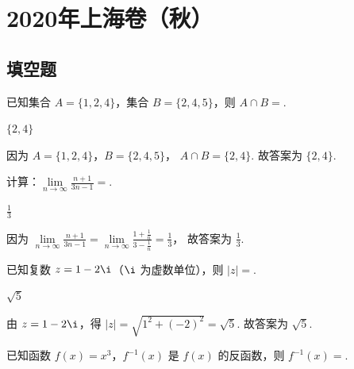 

\chapter{2020年上海卷（秋）}

\section{填空题}

\begin{problem}
已知集合 \(A=\{1,2,4\}\)，集合 \(B=\{2,4,5\}\)，则 \(A\cap B=\)\fillinblank{}.
\end{problem}

\begin{answer}
\(\{2,4\}\)
\end{answer}

\begin{solution}
因为 \(A=\{1,2,4\}\)，\(B=\{2,4,5\}\)，
\(A\cap B=\{2,4\}\).
故答案为 \(\{2,4\}\).
\end{solution}

\begin{problem}
计算：\(\lim\limits_{n\to\infty}\frac{n+1}{3n-1}=\)\fillinblank{}.
\end{problem}

\begin{answer}
\(\frac13\)
\end{answer}

\begin{solution}
因为
\(\lim\limits_{n\to\infty}\frac{n+1}{3n-1} =\lim\limits_{n\to\infty}\frac{1+\frac1n}{3-\frac1n} =\frac13\)，
故答案为 \(\frac13\).
\end{solution}

\begin{problem}
已知复数 \(z=1-2\i\)（\(\i\) 为虚数单位），则 \(|z|=\)\fillinblank{}.
\end{problem}

\begin{answer}
\(\sqrt5\)
\end{answer}

\begin{solution}
由 \(z=1-2\i\)，得
\(|z|=\sqrt{1^2+(-2)^2}=\sqrt5\).
故答案为 \(\sqrt5\).
\end{solution}

\begin{problem}
已知函数 \(f(x)=x^3\)，\(f^{-1}(x)\) 是 \(f(x)\) 的反函数，则 \(f^{-1}(x)=\)\fillinblank{}.
\end{problem}

